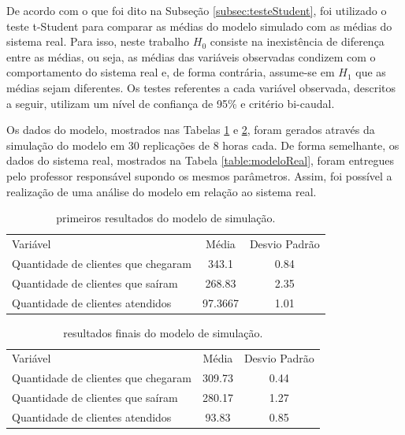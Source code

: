 \documentclass[pt,disc,oneside]{ufscpgeasthesis}
\begin{document}
			De acordo com o que foi dito na Subseção \ref{subsec:testeStudent}, foi utilizado o teste t-Student para comparar as médias do modelo simulado com as médias do sistema real.
			Para isso, neste trabalho $H_0$ consiste na inexistência de diferença entre as médias, ou seja, as médias das variáveis observadas condizem com o comportamento do sistema real e, de forma contrária, assume-se em $H_1$ que as médias sejam diferentes.
			Os testes referentes a cada variável observada, descritos a seguir, utilizam um nível de confiança de 95\% e critério bi-caudal.

			Os dados do modelo, mostrados nas Tabelas \ref{table:modeloErrado} e \ref{table:modeloCorreto}, foram gerados através da simulação do modelo em 30 replicações de 8 horas cada.
			De forma semelhante, os dados do sistema real, mostrados na Tabela \ref{table:modeloReal}, foram entregues pelo professor responsável supondo os mesmos parâmetros.
			Assim, foi possível a realização de uma análise do modelo em relação ao sistema real.

			\begin{table}[!ht]
				\centering
				\begin{tabular}{l|c|c}
					\rowcolor{gray!70} Variável 						   & Média   & Desvio Padrão \\
					\rowcolor{gray!20} Quantidade de clientes que chegaram & 343.1   & 0.84 		 \\
					\rowcolor{gray!40} Quantidade de clientes que saíram   & 268.83  & 2.35 		 \\
					\rowcolor{gray!20} Quantidade de clientes atendidos    & 97.3667 & 1.01
				\end{tabular}
				\caption{primeiros resultados do modelo de simulação.}
				\label{table:modeloErrado}
			\end{table}

			\begin{table}[!ht]
				\centering
				\begin{tabular}{l|c|c}
					\rowcolor{gray!70} Variável 						   & Média   & Desvio Padrão \\
					\rowcolor{gray!20} Quantidade de clientes que chegaram & 309.73  & 0.44 		 \\
					\rowcolor{gray!40} Quantidade de clientes que saíram   & 280.17  & 1.27 		 \\
					\rowcolor{gray!20} Quantidade de clientes atendidos    & 93.83   & 0.85
				\end{tabular}
				\caption{resultados finais do modelo de simulação.}
				\label{table:modeloCorreto}
			\end{table}
\end{document}
